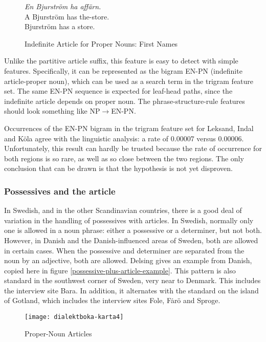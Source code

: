 \begin{figure}
  {\it En Bjurstr\"om ha aff\"arn.} \\
  A Bjurstr\"om has the-store. \\
  Bjurstr\"om has a store. \\
  \caption{Indefinite Article for Proper Nouns: First Names}
  \label{indefinite-article-proper-noun}
\end{figure}

Unlike the partitive article suffix, this feature is easy to detect
with simple features. Specifically, it can be represented as the
bigram EN-PN (indefinite article-proper noun), which can be used as a
search term in the trigram feature set. The same EN-PN sequence is
expected for leaf-head paths, since the indefinite article depends on
proper noun. The phrase-structure-rule features should
look something like NP$\to$EN-PN.

Occurrences of the EN-PN bigram in the trigram feature set for
Leksand, Indal and K\"ola agree with the linguistic analysis: a rate
of 0.00007 versus 0.00006. Unfortunately, this result can hardly be
trusted because the rate of occurrence for both regions is so rare, as
well as so close between the two regions. The only conclusion that can
be drawn is that the hypothesis is not yet disproven.

\subsubsection{Possessives and the article}

In Swedish, and in the other Scandinavian countries, there is a good
deal of variation in the handling of possessives with articles. In
Swedish, normally only one is allowed in a noun phrase: either a
possessive or a determiner, but not both. However, in Danish and the
Danish-influenced areas of Sweden, both are allowed in certain
cases. When the possessive and determiner are separated from the noun
by an adjective, both are allowed. Delsing gives an example from
Danish, copied here in figure \ref{possessive-plus-article-example}.
This pattern is also standard in the southwest corner of Sweden, very
near to Denmark. This includes the interview site Bara. In addition,
it alternates with the standard on the island of Gotland, which
includes the interview sites Fole, F\.ar\"o and Sproge.

\begin{figure}
  \texttt{[image: dialektboka-karta4]}
  \caption{Proper-Noun Articles}
  \label{possessive-plus-article-map}
\end{figure}

